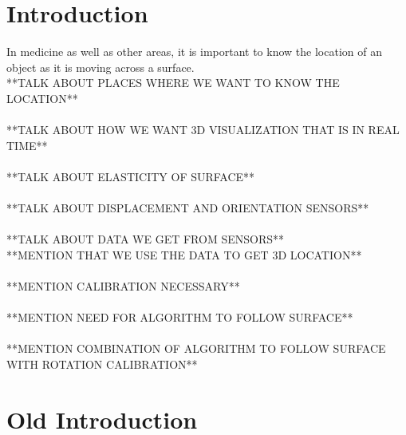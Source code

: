 \section{Introduction}

In medicine as well as other areas, it is important to know the location of an object as it is moving across a surface.\\
**TALK ABOUT PLACES WHERE WE WANT TO KNOW THE LOCATION**\\
\\
**TALK ABOUT HOW WE WANT 3D VISUALIZATION THAT IS IN REAL TIME**\\
\\
**TALK ABOUT ELASTICITY OF SURFACE**\\
\\
**TALK ABOUT DISPLACEMENT AND ORIENTATION SENSORS**\\
\\
**TALK ABOUT DATA WE GET FROM SENSORS**\\
**MENTION THAT WE USE THE DATA TO GET 3D LOCATION**\\
\\
**MENTION CALIBRATION NECESSARY**\\
\\
**MENTION NEED FOR ALGORITHM TO FOLLOW SURFACE**\\
\\
**MENTION COMBINATION OF ALGORITHM TO FOLLOW SURFACE WITH ROTATION CALIBRATION**\\

\section{Old Introduction}

